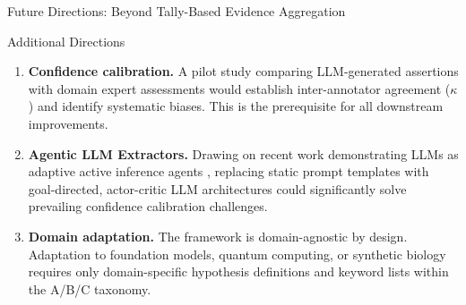 \documentclass[
  ignorenonframetext,
]{beamer}
\begin{document}
\begin{frame}{Future Directions: Beyond Tally-Based Evidence
Aggregation}
\begin{block}{Additional Directions}
\protect{}\label{additional-directions}
\begin{enumerate}
\item
  \textbf{Confidence calibration.} A pilot study comparing LLM-generated
  assertions with domain expert assessments would establish
  inter-annotator agreement (\(\kappa\)) and identify systematic biases.
  This is the prerequisite for all downstream improvements.
\item
  \textbf{Agentic LLM Extractors.} Drawing on recent work demonstrating
  LLMs as adaptive active inference agents \citep{heins2024active},
  replacing static prompt templates with goal-directed, actor-critic LLM
  architectures could significantly solve prevailing confidence
  calibration challenges.
\item
  \textbf{Domain adaptation.} The framework is domain-agnostic by
  design. Adaptation to foundation models, quantum computing, or
  synthetic biology requires only domain-specific hypothesis definitions
  and keyword lists within the A/B/C taxonomy.
\end{enumerate}
\end{block}
\end{frame}
\end{document}
